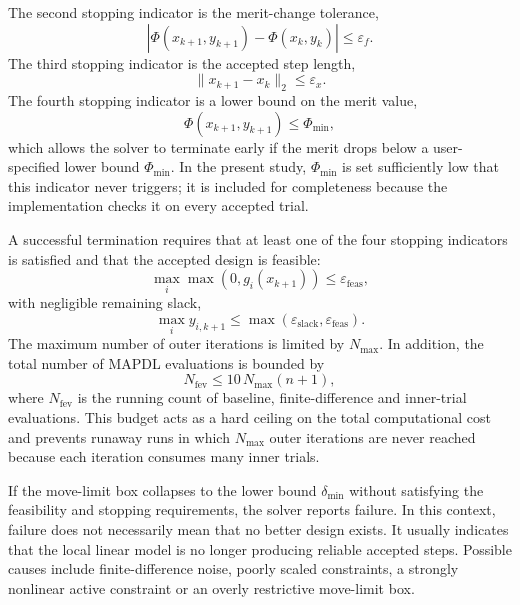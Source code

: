 \documentclass[11pt,a4paper]{article}
\begin{document}
The second stopping indicator is the merit-change tolerance,
\begin{equation}
\label{eq:appA_stop_merit}
    \left|
        \Phi(x_{k+1},y_{k+1})
        -
        \Phi(x_k,y_k)
    \right|
    \leq
    \varepsilon_f .
\end{equation}
The third stopping indicator is the accepted step length,
\begin{equation}
\label{eq:appA_stop_step}
    \|x_{k+1}-x_k\|_2
    \leq
    \varepsilon_x .
\end{equation}
The fourth stopping indicator is a lower bound on the merit value,
\begin{equation}
\label{eq:appA_stop_obj_limit}
    \Phi(x_{k+1},y_{k+1})
    \leq
    \Phi_{\min},
\end{equation}
which allows the solver to terminate early if the merit drops below a
user-specified lower bound $\Phi_{\min}$. In the present study,
$\Phi_{\min}$ is set sufficiently low that this indicator never
triggers; it is included for completeness because the implementation
checks it on every accepted trial.

A successful termination requires that at least one of the four
stopping indicators is satisfied and that the accepted design is
feasible:
\begin{equation}
\label{eq:appA_stop_feas}
    \max_i \max\left(0,g_i(x_{k+1})\right)
    \leq
    \varepsilon_{\mathrm{feas}},
\end{equation}
with negligible remaining slack,
\begin{equation}
\label{eq:appA_stop_slack}
    \max_i y_{i,k+1}
    \leq
    \max\left(
        \varepsilon_{\mathrm{slack}},
        \varepsilon_{\mathrm{feas}}
    \right).
\end{equation}
The maximum number of outer iterations is limited by $N_{\max}$. In
addition, the total number of MAPDL evaluations is bounded by
\begin{equation}
\label{eq:appA_stop_nfev}
    N_{\mathrm{fev}} \leq 10\,N_{\max}(n+1),
\end{equation}
where $N_{\mathrm{fev}}$ is the running count of baseline,
finite-difference and inner-trial evaluations. This budget acts as a
hard ceiling on the total computational cost and prevents runaway
runs in which $N_{\max}$ outer iterations are never reached because
each iteration consumes many inner trials.

If the move-limit box collapses to the lower bound
$\delta_{\min}$ without satisfying the feasibility and stopping
requirements, the solver reports failure. In this context, failure
does not necessarily mean that no better design exists. It usually
indicates that the local linear model is no longer producing reliable
accepted steps. Possible causes include finite-difference noise,
poorly scaled constraints, a strongly nonlinear active constraint or
an overly restrictive move-limit box.
\end{document}
